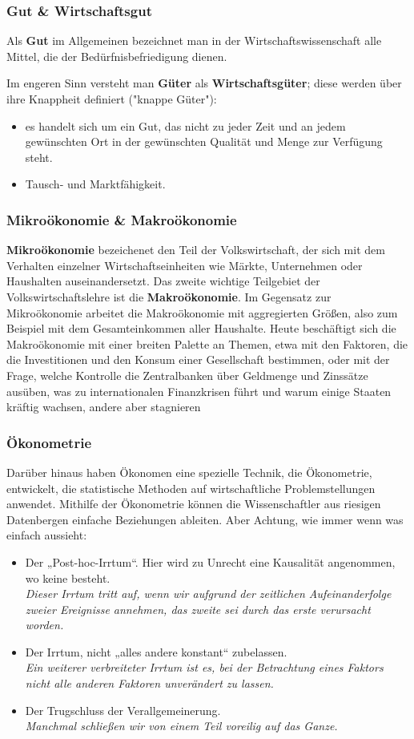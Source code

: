 \documentclass[10pt]{scrartcl}
\begin{document}
\subsubsection{Gut \& Wirtschaftsgut}
Als {\bf Gut } im Allgemeinen bezeichnet man in der Wirtschaftswissenschaft alle Mittel, die der Bedürfnisbefriedigung dienen.

Im engeren Sinn versteht man {\bf Güter} als {\bf Wirtschaftsgüter}; diese werden über ihre Knappheit definiert ("knappe Güter"):
\begin{itemize}
\item es handelt sich um ein Gut, das nicht zu jeder Zeit und an jedem gewünschten Ort in der gewünschten Qualität und Menge zur Verfügung steht.
\item Tausch- und Marktfähigkeit.
\end{itemize}

\subsubsection{Mikroökonomie \& Makroökonomie}
{\bf Mikroökonomie} bezeichenet den Teil der Volkswirtschaft, der sich mit dem Verhalten einzelner Wirtschaftseinheiten wie Märkte, Unternehmen oder Haushalten auseinandersetzt.
Das zweite wichtige Teilgebiet der Volkswirtschaftslehre ist die {\bf Makroökonomie}. Im Gegensatz zur Mikroökonomie arbeitet die Makroökonomie mit aggregierten Größen, also zum Beispiel mit dem Gesamteinkommen aller Haushalte. Heute beschäftigt sich die Makroökonomie mit einer breiten Palette an Themen, etwa mit den Faktoren, die die Investitionen und den Konsum einer Gesellschaft bestimmen, oder mit der Frage, welche Kontrolle die Zentralbanken über Geldmenge und Zinssätze ausüben, was zu internationalen Finanzkrisen führt und warum einige Staaten kräftig wachsen, andere aber stagnieren

\subsubsection{Ökonometrie}
Darüber hinaus haben Ökonomen eine
spezielle Technik, die Ökonometrie, entwickelt, die statistische Methoden auf wirtschaftliche Problemstellungen anwendet. Mithilfe der Ökonometrie können die Wissenschaftler aus riesigen Datenbergen einfache Beziehungen ableiten.
Aber Achtung, wie immer wenn was einfach aussieht:
\begin{itemize}
\item  Der „Post-hoc-Irrtum“. Hier wird zu Unrecht eine Kausalität angenommen, wo
keine besteht.\\
{\it Dieser Irrtum tritt auf, wenn wir aufgrund der zeitlichen Aufeinanderfolge zweier Ereignisse annehmen, das zweite sei durch das erste verursacht worden.} 
\item  Der Irrtum, nicht „alles andere konstant“ zubelassen.\\
{\it Ein weiterer verbreiteter Irrtum ist es, bei der Betrachtung eines Faktors nicht alle anderen Faktoren unverändert zu lassen. }
\item  Der Trugschluss der Verallgemeinerung.\\
{\it Manchmal schließen wir von einem Teil voreilig auf das Ganze. }
\end{itemize}
\end{document}

